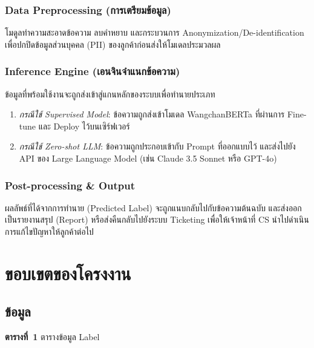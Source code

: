 \subsubsection{Data Preprocessing (การเตรียมข้อมูล)}
โมดูลทำความสะอาดข้อความ ลบคำหยาบ และกระบวนการ Anonymization/De-identification เพื่อปกปิดข้อมูลส่วนบุคคล (PII) ของลูกค้าก่อนส่งให้โมเดลประมวลผล

\subsubsection{Inference Engine (เอนจินจำแนกข้อความ)}
ข้อมูลที่พร้อมใช้งานจะถูกส่งเข้าสู่แกนหลักของระบบเพื่อทำนายประเภท
\begin{enumerate}[label=(\arabic*)]
    \item \textit{กรณีใช้ Supervised Model}: ข้อความถูกส่งเข้าโมเดล WangchanBERTa ที่ผ่านการ Fine-tune และ Deploy ไว้บนเซิร์ฟเวอร์
    \item \textit{กรณีใช้ Zero-shot LLM}: ข้อความถูกประกอบเข้ากับ Prompt ที่ออกแบบไว้ และส่งไปยัง API ของ Large Language Model (เช่น Claude 3.5 Sonnet หรือ GPT-4o)
\end{enumerate}

\subsubsection{Post-processing \& Output}
ผลลัพธ์ที่ได้จากการทำนาย (Predicted Label) จะถูกแนบกลับไปกับข้อความต้นฉบับ และส่งออกเป็นรายงานสรุป (Report) หรือส่งคืนกลับไปยังระบบ Ticketing เพื่อให้เจ้าหน้าที่ CS นำไปดำเนินการแก้ไขปัญหาให้ลูกค้าต่อไป

\section{ขอบเขตของโครงงาน}

\subsection{ข้อมูล}

\noindent\textbf{ตารางที่~1} ตารางข้อมูล Label

